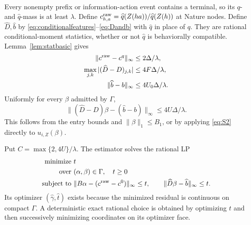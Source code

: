 \documentclass[11pt,a4paper]{article}
\numberwithin{equation}{section}
\theoremstyle{definition}
\begin{document}
Every nonempty prefix or information-action event contains a terminal,
so its \(q\)- and \(\widehat q\)-mass is at least \(\lambda\).
Define \(c^{\rm raw}_{h,a}=\widehat q(Z(ha))/\widehat q(Z(h))\)
at Nature nodes. Define \(\widehat D,\widehat b\) by
\eqref{eq:conditionalfeatures}--\eqref{eq:Dandb} with \(\widehat q\)
in place of \(q\). They are rational conditional-moment statistics,
whether or not \(\widehat q\) is behaviorally compatible.
Lemma~\ref{lem:statbasic} gives
\begin{equation}\label{eq:S4}
 \begin{split}
 \|c^{\rm raw}-c^q\|_\infty&\le2\Delta/\lambda,\\
 \max_{j,k}|(\widehat D-D)_{j,k}|&\le4F\Delta/\lambda,\\
 \|\widehat b-b\|_\infty&\le4U_0\Delta/\lambda .
 \end{split}
\end{equation}
Uniformly for every \(\beta\) admitted by \(\Gamma\),
\begin{equation}\label{eq:S5}
 \|(\widehat D-D)\beta-(\widehat b-b)\|_\infty
                    \le4U\Delta/\lambda .
\end{equation}
This follows from the entry bounds and \(\|\beta\|_1\le B_1\),
or by applying \eqref{eq:S2} directly to \(u_{i,Z}(\beta)\).

Put \(C=\max\{2,4U\}/\lambda\). The estimator solves the rational LP
\begin{equation}\label{eq:fitLP}
 \begin{aligned}
 \text{minimize }&t\\
 \text{over }&(\alpha,\beta)\in\Gamma,\quad t\ge0\\
 \text{subject to }&
   \|B\alpha-(c^{\rm raw}-c^0)\|_\infty\le t,\qquad
   \|\widehat D\beta-\widehat b\|_\infty\le t .
 \end{aligned}
\end{equation}
Its optimizer \((\widehat\gamma,\widehat t)\) exists because the
minimized residual is continuous on compact \(\Gamma\).
A deterministic exact rational choice is obtained by optimizing \(t\)
and then successively minimizing coordinates on its optimizer face.
\end{document}
